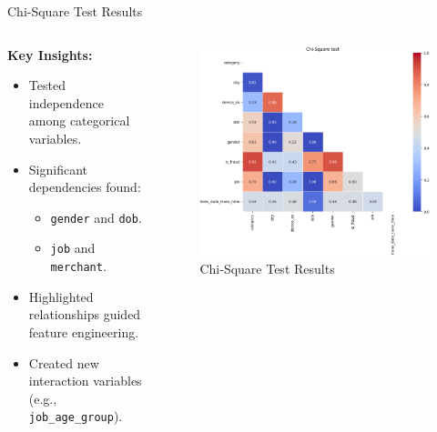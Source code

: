 \documentclass{beamer}
\begin{document}
\begin{frame}{Chi-Square Test Results}
    \begin{columns} %
        \begin{column}{0.5\textwidth}
            \textbf{Key Insights:}
            \begin{itemize}
                \item Tested independence among categorical variables.
                \item Significant dependencies found:
                \begin{itemize}
                    \item \texttt{gender} and \texttt{dob}.
                    \item \texttt{job} and \texttt{merchant}.
                \end{itemize}
                \item Highlighted relationships guided feature engineering.
                \item Created new interaction variables (e.g., \texttt{job\_age\_group}).
            \end{itemize}
        \end{column}
        
        \begin{column}{0.5\textwidth}
            \begin{figure}
                \centering
                \includegraphics[width=1\textwidth]{images/chi.png} %
                \caption{Chi-Square Test Results}
            \end{figure}
        \end{column}
    \end{columns}
\end{frame}
\end{document}
